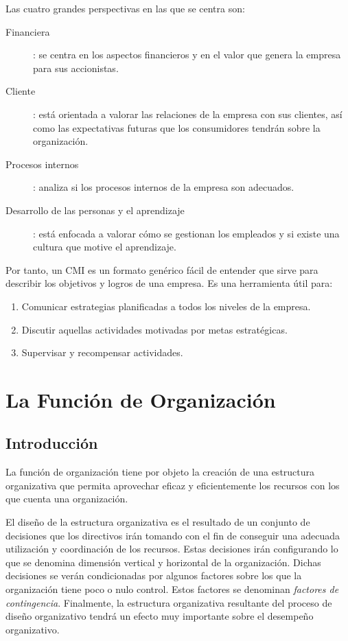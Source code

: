 \documentclass[12pt,a4paper,spanish]{report}
\begin{document}
			Las cuatro grandes perspectivas en las que se centra son:
			\begin{description}
				\item[Financiera]: se centra en los aspectos financieros y en el valor que genera la empresa para sus accionistas.
				\item[Cliente]: está orientada a valorar las relaciones de la empresa con sus clientes, así como las expectativas futuras que los consumidores tendrán sobre la organización.
				\item[Procesos internos]: analiza si los procesos internos de la empresa son adecuados.
				\item[Desarrollo de las personas y el aprendizaje]: está enfocada a valorar cómo se gestionan los empleados y si existe una cultura que motive el aprendizaje.
			\end{description}

			Por tanto, un CMI es un formato genérico fácil de entender que sirve para describir los objetivos y logros de una empresa. Es una herramienta útil para:
			\begin{enumerate}
				\item Comunicar estrategias planificadas a todos los niveles de la empresa.
				\item Discutir aquellas actividades motivadas por metas estratégicas.
				\item Supervisar y recompensar actividades.
			\end{enumerate}

\chapter{\textcolor[rgb]{0.5,0.1,0.4}{La Función de Organización}}
	\section{\textcolor[rgb]{0.5,0.1,0.4}Introducción}
		La función de organización tiene por objeto la creación de una estructura organizativa que permita aprovechar eficaz y eficientemente los recursos con los que cuenta una organización.

		El diseño de la estructura organizativa es el resultado de un conjunto de decisiones que los directivos irán tomando con el fin de conseguir una adecuada utilización y coordinación de los recursos. Estas decisiones irán configurando lo que se denomina dimensión vertical y horizontal de la organización. Dichas decisiones se verán condicionadas por algunos factores sobre los que la organización tiene poco o nulo control. Estos factores se denominan \textcolor[rgb]{0.5,0.1,0.4}{\emph{factores de contingencia}}. Finalmente, la estructura organizativa resultante del proceso de diseño organizativo tendrá un efecto muy importante sobre el desempeño organizativo.
\end{document}
